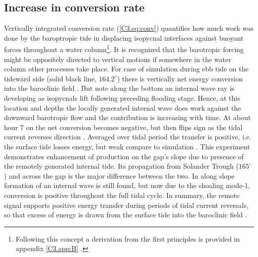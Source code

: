 \documentclass[12pt]{article}
\begin{document}
\subsection{Increase in conversion rate}
Vertically integrated conversion rate (\ref{C3.eq:conv}) quantifies how much work was done by the 
baroptropic tide in displacing isopycnal interfaces against buoyant forces throughout a water 
column\footnote{Following this concept a derivation from the first principles is provided in 
appendix \ref{C3.app:B} \citep[see also]{kurapov2003m, kelly2010topo}.}. It is recognized 
that the barotropic forcing might be oppositely directed to vertical motions if somewhere in the 
water column other processes take place. For case of  simulation 
 during ebb tide on the tideward side (solid black line, 
$164.2^{\circ}$) there is vertically net energy conversion into the baroclinic field 
. But note along the bottom an internal wave ray is developing as 
isopycnals lift following preceding flooding stage. Hence, at this location and depths the locally 
generated internal wave does work against the downward barotropic flow and the contribution is 
increasing with time. At about hour 7 on  the net conversion becomes 
negative, but then flips sign as the tidal current reverses direction . 
Averaged over tidal period the transfer is positive, i.e. the surface tide losses energy, but weak 
compare to  simulation . This experiment demonstrates 
enhancement of production on the gap's slope due to presence of the remotely generated internal 
tide. Its propagation from Solander Trough ($165^{\circ}$) and across the gap is the major 
difference between the two. In  along slope formation of an internal wave is still 
found, but now due to the shoaling mode-1, conversion is positive throughout the full tidal cycle. 
In summary, the remote signal supports positive energy transfer during periods of tidal current 
reversals, so that excess of energy is drawn from the surface tide into the baroclinic field 
.\\
\end{document}
